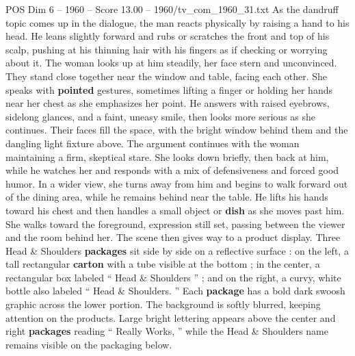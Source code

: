 \begin{textsample}{POS Dim 6 – 1960 – Score 13.00 – 1960/tv\_com\_1960\_31.txt}
As the dandruff topic comes up in the dialogue, the man reacts physically by raising a hand to his head.
He leans slightly forward and rubs or scratches the front and top of his scalp, pushing at his thinning hair with his fingers as if checking or worrying about it.
The woman looks up at him steadily, her face stern and unconvinced.
They stand close together near the window and table, facing each other.
She speaks with \textbf{pointed} gestures, sometimes lifting a finger or holding her hands near her chest as she emphasizes her point.
He answers with raised eyebrows, sidelong glances, and a faint, uneasy smile, then looks more serious as she continues.
Their faces fill the space, with the bright window behind them and the dangling light fixture above.
The argument continues with the woman maintaining a firm, skeptical stare.
She looks down briefly, then back at him, while he watches her and responds with a mix of defensiveness and forced good humor.
In a wider view, she turns away from him and begins to walk forward out of the dining area, while he remains behind near the table.
He lifts his hands toward his chest and then handles a small object or \textbf{dish} as she moves past him.
She walks toward the foreground, expression still set, passing between the viewer and the room behind her.
The scene then gives way to a product display.
Three Head \& Shoulders \textbf{packages} sit side by side on a reflective surface : on the left, a tall rectangular \textbf{carton} with a tube visible at the bottom ; in the center, a rectangular box labeled “ Head \& Shoulders ” ; and on the right, a curvy, white bottle also labeled “ Head \& Shoulders. ” Each \textbf{package} has a bold dark swoosh graphic across the lower portion.
The background is softly blurred, keeping attention on the products.
Large bright lettering appears above the center and right \textbf{packages} reading “ Really Works, ” while the Head \& Shoulders name remains visible on the packaging below.

\end{textsample}
